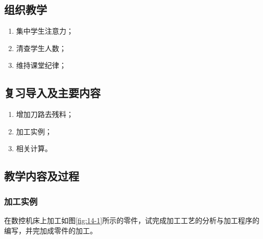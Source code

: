 \jxhj{%
	}

\makeshouye %

\subsection{组织教学}
\begin{enumerate}[\hspace{2em}1、]
	\item 集中学生注意力；
	\item 清查学生人数；
	\item 维持课堂纪律；
\end{enumerate}

\subsection{复习导入及主要内容}
\begin{enumerate}[1、]
\item 增加刀路去残料；
\item 加工实例；
\item 相关计算。
\end{enumerate}

\subsection{教学内容及过程}
\subsubsection{加工实例}
在数控机床上加工如图\ref{fig:14-1}所示的零件，试完成加工工艺的分析与加工程序的编写，并完加成零件的加工。

